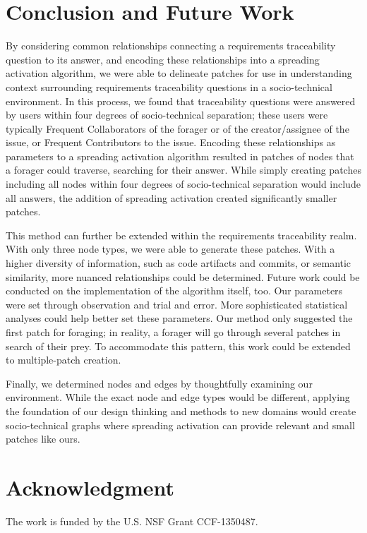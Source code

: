 \documentclass[conference]{IEEEtran}
\begin{document}
\section{Conclusion and Future Work}
By considering common relationships connecting a requirements traceability question to its answer, and encoding these relationships into a spreading activation algorithm, we were able to delineate patches for use in understanding context surrounding requirements traceability questions in a socio-technical environment. In this process, we found that traceability questions were answered by users within four degrees of socio-technical separation; these users were typically Frequent Collaborators of the forager or of the creator/assignee of the issue, or Frequent Contributors to the issue. Encoding these relationships as parameters to a spreading activation algorithm resulted in patches of nodes that a forager could traverse, searching for their answer. While simply creating patches including all nodes within four degrees of socio-technical separation would include all answers, the addition of spreading activation created significantly smaller patches.

This method can further be extended within the requirements traceability realm. With only three node types, we were able to generate these patches. With a higher diversity of information, such as code artifacts and commits, or semantic similarity, more nuanced relationships could be determined. Future work could be conducted on the implementation of the algorithm itself, too. Our parameters were set through observation and trial and error. More sophisticated statistical analyses could help better set these parameters. Our method only suggested the first patch for foraging; in reality, a forager will go through several patches in search of their prey. To accommodate this pattern, this work could be extended to multiple-patch creation. 

Finally, we determined nodes and edges by thoughtfully examining our environment. While the exact node and edge types would be different, applying the foundation of our design thinking and methods to new domains would create socio-technical graphs where spreading activation can provide relevant and small patches like ours. 

\section*{Acknowledgment}
The work is funded by the U.S. NSF Grant CCF-1350487.

\newpage
\balance

 
\end{document}
